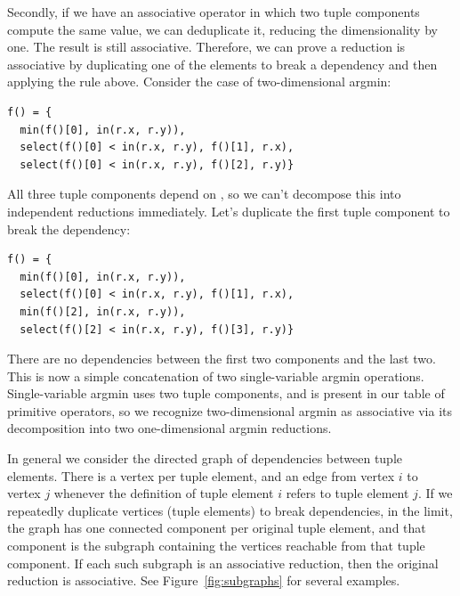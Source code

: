 

Secondly, if we have an associative operator in which two tuple components compute the same value, we can deduplicate it, reducing the dimensionality by one. The result is still associative. Therefore, we can prove a reduction is associative by duplicating one of the elements to break a dependency and then applying the rule above. Consider the case of two-dimensional argmin:

\begin{lstlisting}[caption={Two-dimensional argmin. The three tuple components are the minimum value, and its $x$ and $y$ coordinates.}]
f() = {
  min(f()[0], in(r.x, r.y)),
  select(f()[0] < in(r.x, r.y), f()[1], r.x),
  select(f()[0] < in(r.x, r.y), f()[2], r.y)}
\end{lstlisting}

All three tuple components depend on , so we can't decompose this into independent reductions immediately. Let's duplicate the first tuple component to break the dependency:

\begin{lstlisting}[caption={Two-dimensional argmin with the minimum value redundantly computed as \code{f()[0]} and \code{f()[2]}}]
f() = {
  min(f()[0], in(r.x, r.y)),
  select(f()[0] < in(r.x, r.y), f()[1], r.x),
  min(f()[2], in(r.x, r.y)),
  select(f()[2] < in(r.x, r.y), f()[3], r.y)}
\end{lstlisting}

There are no dependencies between the first two components and the last two. This is now a simple concatenation of two single-variable argmin operations. Single-variable argmin uses two tuple components, and is present in our table of primitive operators, so we recognize two-dimensional argmin as associative via its decomposition into two one-dimensional argmin reductions.

In general we consider the directed graph of dependencies between tuple elements. There is a vertex per tuple element, and an edge from vertex $i$ to vertex $j$ whenever the definition of tuple element $i$ refers to tuple element $j$. If we repeatedly duplicate vertices (tuple elements) to break dependencies, in the limit, the graph has one connected component per original tuple element, and that component is the subgraph containing the vertices reachable from that tuple component. If each such subgraph is an associative reduction, then the original reduction is associative. See Figure~\ref{fig:subgraphs} for several examples.

